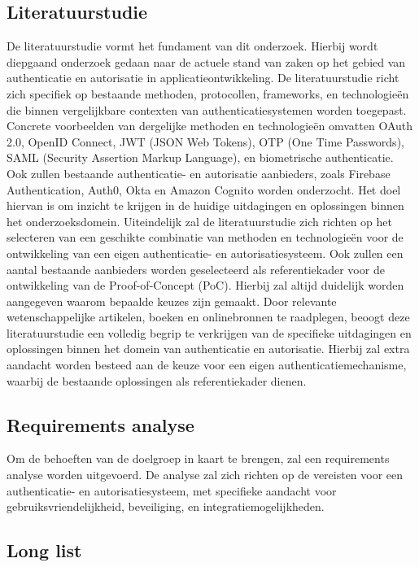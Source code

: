 \subsection{Literatuurstudie}

De literatuurstudie vormt het fundament van dit onderzoek. Hierbij wordt diepgaand onderzoek gedaan naar de actuele stand van zaken op het gebied 
van authenticatie en autorisatie in applicatieontwikkeling. De literatuurstudie richt zich specifiek op bestaande methoden, protocollen, frameworks, 
en technologieën die binnen vergelijkbare contexten van authenticatiesystemen worden toegepast. Concrete voorbeelden van dergelijke methoden en 
technologieën omvatten OAuth 2.0, OpenID Connect, JWT (JSON Web Tokens), OTP (One Time Passwords), SAML (Security Assertion Markup Language), en 
biometrische authenticatie. Ook zullen bestaande authenticatie- en autorisatie aanbieders, zoals Firebase Authentication, Auth0, Okta en Amazon Cognito
worden onderzocht. Het doel hiervan is om inzicht te krijgen in de huidige uitdagingen en oplossingen binnen het onderzoeksdomein.
Uiteindelijk zal de literatuurstudie zich richten op het selecteren van een geschikte combinatie van methoden en technologieën voor de ontwikkeling
van een eigen authenticatie- en autorisatiesysteem. Ook zullen een aantal bestaande aanbieders worden geselecteerd als referentiekader voor de
ontwikkeling van de Proof-of-Concept (PoC). Hierbij zal altijd duidelijk worden aangegeven waarom bepaalde keuzes zijn gemaakt.
Door relevante wetenschappelijke artikelen, boeken en onlinebronnen te raadplegen, beoogt deze literatuurstudie een volledig begrip te verkrijgen 
van de specifieke uitdagingen en oplossingen binnen het domein van authenticatie en autorisatie. Hierbij zal extra aandacht worden besteed aan de 
keuze voor een eigen authenticatiemechanisme, waarbij de bestaande oplossingen als referentiekader dienen.

\subsection{Requirements analyse}

Om de behoeften van de doelgroep in kaart te brengen, zal een requirements analyse worden uitgevoerd.
De analyse zal zich richten op de vereisten voor een authenticatie- en 
autorisatiesysteem, met specifieke aandacht voor gebruiksvriendelijkheid, beveiliging, en integratiemogelijkheden.

\subsection{Long list} 

